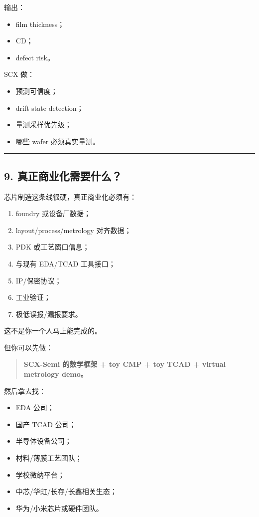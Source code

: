 \documentclass[
  12pt,
]{ctexart}
\providecommand{\tightlist}{%
  \setlength{\itemsep}{0pt}\setlength{\parskip}{0pt}}
\begin{document}
输出：

\begin{itemize}
\tightlist
\item
  film thickness；
\item
  CD；
\item
  defect risk。
\end{itemize}

SCX 做：

\begin{itemize}
\tightlist
\item
  预测可信度；
\item
  drift state detection；
\item
  量测采样优先级；
\item
  哪些 wafer 必须真实量测。
\end{itemize}

\begin{center}\rule{0.5\linewidth}{0.5pt}\end{center}

\subsection{9.
真正商业化需要什么？}\label{ux771fux6b63ux5546ux4e1aux5316ux9700ux8981ux4ec0ux4e48}

芯片制造这条线很硬，真正商业化必须有：

\begin{enumerate}
\def\labelenumi{\arabic{enumi}.}
\tightlist
\item
  foundry 或设备厂数据；
\item
  layout/process/metrology 对齐数据；
\item
  PDK 或工艺窗口信息；
\item
  与现有 EDA/TCAD 工具接口；
\item
  IP/保密协议；
\item
  工业验证；
\item
  极低误报/漏报要求。
\end{enumerate}

这不是你一个人马上能完成的。

但你可以先做：

\begin{quote}
\textbf{SCX-Semi 的数学框架 + toy CMP + toy TCAD + virtual metrology
demo。}
\end{quote}

然后拿去找：

\begin{itemize}
\tightlist
\item
  EDA 公司；
\item
  国产 TCAD 公司；
\item
  半导体设备公司；
\item
  材料/薄膜工艺团队；
\item
  学校微纳平台；
\item
  中芯/华虹/长存/长鑫相关生态；
\item
  华为/小米芯片或硬件团队。
\end{itemize}
\end{document}
